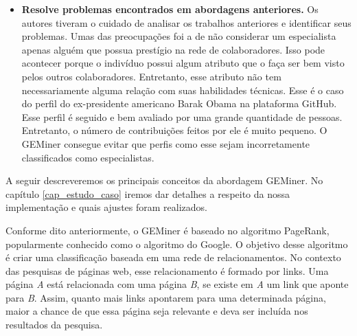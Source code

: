 \begin{itemize}
\item \textbf{Resolve problemas encontrados em abordagens anteriores.} Os autores tiveram o cuidado de analisar os trabalhos anteriores e identificar seus problemas. Umas das preocupações foi a de não considerar um especialista apenas alguém que possua prestígio na rede de colaboradores. Isso pode acontecer porque o indivíduo possui algum atributo que o faça ser bem visto pelos outros colaboradores. Entretanto, esse atributo não tem necessariamente alguma relação com suas habilidades técnicas. Esse é o caso do perfil do ex-presidente americano Barak Obama na plataforma GitHub. Esse perfil é seguido e bem avaliado por uma grande quantidade de pessoas. Entretanto, o número de contribuições feitos por ele é muito pequeno. O GEMiner consegue evitar que perfis como esse sejam incorretamente classificados como especialistas.
\end{itemize}





A seguir descreveremos os principais conceitos da abordagem GEMiner. No capítulo \ref{cap_estudo_caso} iremos dar detalhes a respeito da nossa implementação e quais ajustes foram realizados.

Conforme dito anteriormente, o GEMiner é baseado no algoritmo PageRank, popularmente conhecido como o algoritmo do Google. O objetivo desse algoritmo é criar uma classificação baseada em uma rede de relacionamentos. No contexto das pesquisas de páginas web, esse relacionamento é formado por links. Uma página \textit{A} está relacionada com uma página \textit{B}, se existe em \textit{A} um link que aponte para \textit{B}. Assim, quanto mais links apontarem para uma determinada página, maior a  chance de que essa página seja relevante e deva ser incluída nos resultados da pesquisa.  

